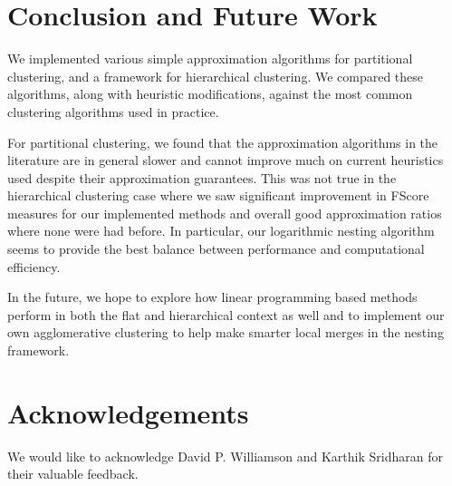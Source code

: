 \documentclass[conference, 10pt, final]{IEEEtran}
\begin{document}
\section{Conclusion and Future Work}
We implemented various simple approximation algorithms for partitional clustering, and a framework for hierarchical clustering.  We compared these algorithms, along with heuristic modifications, against the most common clustering algorithms used in practice.

For partitional clustering, we found that the approximation algorithms in the literature are in general slower and cannot improve much on current heuristics used despite their approximation guarantees. This was not true in the hierarchical clustering case where we saw significant improvement in FScore measures for our implemented methods and overall good approximation ratios where none were had before. In particular, our logarithmic nesting algorithm seems to provide the best balance between performance and computational efficiency.

In the future, we hope to explore how linear programming based methods perform in both the flat and hierarchical context as well and to implement our own agglomerative clustering to help make smarter local merges in the nesting framework.

\section*{Acknowledgements}
We would like to acknowledge David P. Williamson and Karthik Sridharan for their valuable feedback.






\end{document}
